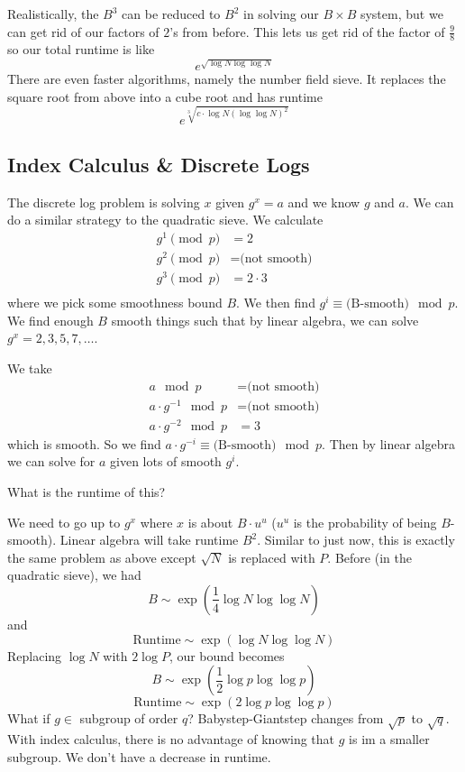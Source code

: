 Realistically, the $B^3$ can be reduced to $B^2$ in solving our $B\times B$ system, but we can get rid of our factors of $2$'s from before. This lets us get rid of the factor of $\frac{9}{8}$ so our total runtime is like
\[e^{\sqrt{\log N\log\log N}}\]
There are even faster algorithms, namely the number field sieve. It replaces the square root from above into a cube root and has runtime
\[e^{\sqrt[3]{c\cdot \log N(\log\log N)^2}}\]

\subsection{Index Calculus \& Discrete Logs}
The discrete log problem is solving $x$ given $g^x = a$ and we know $g$ and $a$. We can do a similar strategy to the quadratic sieve.
We calculate
\begin{align*}
    g^1 \pmod p & = 2                   \\
    g^2 \pmod p & = \text{(not smooth)} \\
    g^3 \pmod p & = 2\cdot 3            \\
\end{align*}
where we pick some smoothness bound $B$. We then find $g^i\equiv \text{(B-smooth)}\mod p$. We find enough $B$ smooth things such that by linear algebra, we can solve $g^x = 2, 3, 5, 7, \dots$.

We take
\begin{align*}
    a\mod p             & = \text{(not smooth)} \\
    a\cdot g^{-1}\mod p & = \text{(not smooth)} \\
    a\cdot g^{-2}\mod p & = 3
\end{align*}
which is smooth. So we find $a\cdot g^{-i}\equiv \text{(B-smooth)}\mod p$. Then by linear algebra we can solve for $a$ given lots of smooth $g^i$.

\begin{ques*}What is the runtime of this? \end{ques*}

We need to go up to $g^x$ where $x$ is about $B\cdot u^u$ ($u^u$ is the probability of being $B$-smooth). Linear algebra will take runtime $B^2$. Similar to just now, this is exactly the same problem as above except $\sqrt{N}$ is replaced with $P$. Before (in the quadratic sieve), we had
\[B\sim \exp\left(\frac{1}{4}\log N\log\log N\right)\]
and
\[\text{Runtime}\sim \exp\left(\log N\log\log N\right)\]
Replacing $\log{N}$ with $2\log P$, our bound becomes
\[B\sim \exp\left(\frac{1}{2}\log p\log\log p\right)\]
\[\text{Runtime}\sim \exp\left(2\log p\log\log p\right)\]
What if $g\in$ subgroup of order $q$? Babystep-Giantstep changes from $\sqrt{p}$ to $\sqrt{q}$. With index calculus, there is no advantage of knowing that $g$ is im a smaller subgroup. We don't have a decrease in runtime. 
